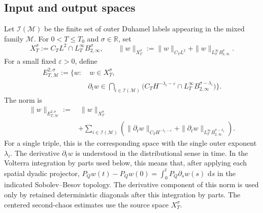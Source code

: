 \documentclass[11pt,reqno]{amsart}
\numberwithin{equation}{section}
\theoremstyle{plain}
\theoremstyle{definition}
\newcommand{\R}{\mathbb R}
\newcommand{\cI}{\mathcal I}
\newcommand{\cM}{\mathcal M}
\newcommand{\eps}{\varepsilon}
\newcommand{\dd}{\,\mathrm d}
\begin{document}
\subsection{Input and output spaces}
Let \(\cI(\cM)\) be the finite set of outer Duhamel labels appearing in the mixed family \(\cM\).  For \(0<T\le T_0\) and \(\sigma\in\R\), set
\begin{equation}\label{eq:X-space}
        X_T^\sigma:=C_TL^2\cap L_T^\infty B^\sigma_{2,\infty},
        \qquad
        \|w\|_{X_T^\sigma}:=\|w\|_{C_TL^2}+\|w\|_{L_T^\infty B^\sigma_{2,\infty}}.
\end{equation}
For a small fixed \(\eps>0\), define
\begin{equation}\label{eq:E-space}
\begin{aligned}
        E_{T,\cM}^{2,\sigma}:=\{w:&\ w\in X_T^\sigma,\\
        &\partial_tw\in \bigcap_{i\in\cI(\cM)}
          \bigl(C_TH^{-\lambda_i-\eps}\cap L_T^\infty B^{\sigma-\lambda_i}_{2,\infty}\bigr)\}.
\end{aligned}
\end{equation}
The norm is
\begin{equation}\label{eq:E-norm}
\begin{aligned}
        \|w\|_{E_{T,\cM}^{2,\sigma}}:=&\ \|w\|_{X_T^\sigma}\\
        &+\sum_{i\in\cI(\cM)}
        \left(\|\partial_tw\|_{C_TH^{-\lambda_i-\eps}}
        +\|\partial_tw\|_{L_T^\infty B^{\sigma-\lambda_i}_{2,\infty}}\right).
\end{aligned}
\end{equation}
For a single triple, this is the corresponding space with the single outer exponent \(\lambda_i\).  The derivative \(\partial_t w\) is understood in the distributional sense in time.  In the Volterra integration by parts used below, this means that, after applying each spatial dyadic projector, \(P_Qw(t)-P_Qw(0)=\int_0^t P_Q\partial_sw(s)\,\dd s\) in the indicated Sobolev--Besov topology.  The derivative component of this norm is used only by retained deterministic diagonals after this integration by parts.  The centered second-chaos estimates use the source space \(X_T^\sigma\).
\end{document}
